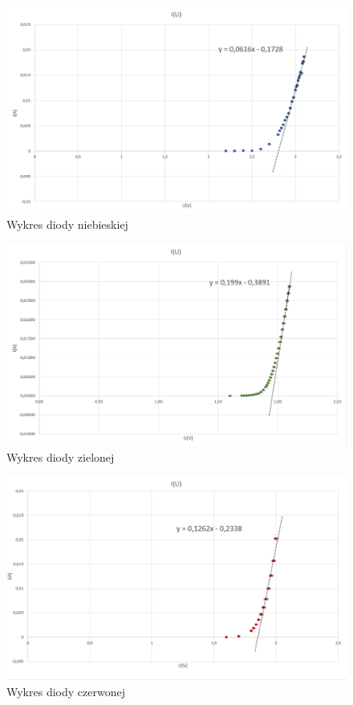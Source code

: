 \documentclass{article}
\begin{document}
\begin{figure}[h]
    \centering
    \includegraphics[scale=0.65]{Wykres_Dioda_Niebieska.png}
    \caption{Wykres diody niebieskiej}
\end{figure}
\begin{figure}[h!]
    \centering
    \includegraphics[scale=0.65]{Wykres_Dioda_Zielona.png}
    \caption{Wykres diody zielonej}
\end{figure}
\newpage
\begin{figure}[th!]
    \centering
    \includegraphics[scale=0.65]{Wykres_Dioda_Czerwona.png}
    \caption{Wykres diody czerwonej}
\end{figure}
\end{document}
